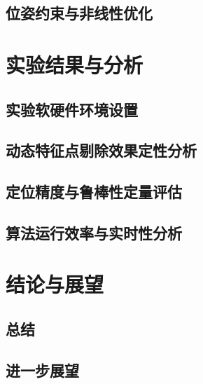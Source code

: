 \documentclass[12pt, a4paper]{ctexart}
\begin{document}
\subsection{位姿约束与非线性优化}

\section{实验结果与分析}
\subsection{实验软硬件环境设置}
\subsection{动态特征点剔除效果定性分析}
\subsection{定位精度与鲁棒性定量评估}
\subsection{算法运行效率与实时性分析}

\section{结论与展望}
\subsection{总结}
\subsection{进一步展望}
\end{document}
